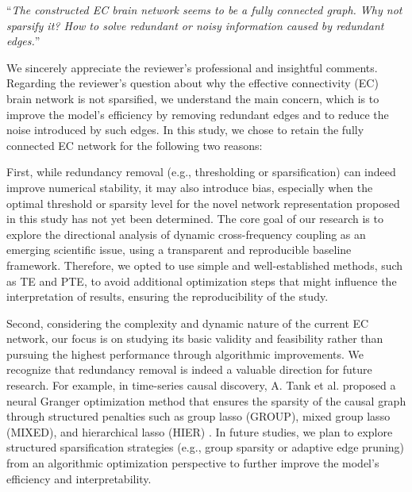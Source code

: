 \documentclass[12pt,technote,onecolumn]{IEEEtran}
\begin{document}
\vspace{4mm}
\newpage

 ``{\it The constructed EC brain network seems to be a fully connected graph. Why not sparsify it? How to solve redundant or noisy information caused by redundant edges.}''
\vspace{1mm}

We sincerely appreciate the reviewer’s professional and insightful comments. Regarding the reviewer’s question about why the effective connectivity (EC) brain network is not sparsified, we understand the main concern, which is to improve the model’s efficiency by removing redundant edges and to reduce the noise introduced by such edges. In this study, we chose to retain the fully connected EC network for the following two reasons:

First, while redundancy removal (e.g., thresholding or sparsification) can indeed improve numerical stability, it may also introduce bias, especially when the optimal threshold or sparsity level for the novel network representation proposed in this study has not yet been determined. The core goal of our research is to explore the directional analysis of dynamic cross-frequency coupling as an emerging scientific issue, using a transparent and reproducible baseline framework. Therefore, we opted to use simple and well-established methods, such as TE and PTE, to avoid additional optimization steps that might influence the interpretation of results, ensuring the reproducibility of the study.

Second, considering the complexity and dynamic nature of the current EC network, our focus is on studying its basic validity and feasibility rather than pursuing the highest performance through algorithmic improvements. We recognize that redundancy removal is indeed a valuable direction for future research. For example, in time-series causal discovery, A. Tank et al. proposed a neural Granger optimization method that ensures the sparsity of the causal graph through structured penalties such as group lasso (GROUP), mixed group lasso (MIXED), and hierarchical lasso (HIER) \cite{tank2021neural}. In future studies, we plan to explore structured sparsification strategies (e.g., group sparsity or adaptive edge pruning) from an algorithmic optimization perspective to further improve the model’s efficiency and interpretability.

\vspace{4mm}
\end{document}

